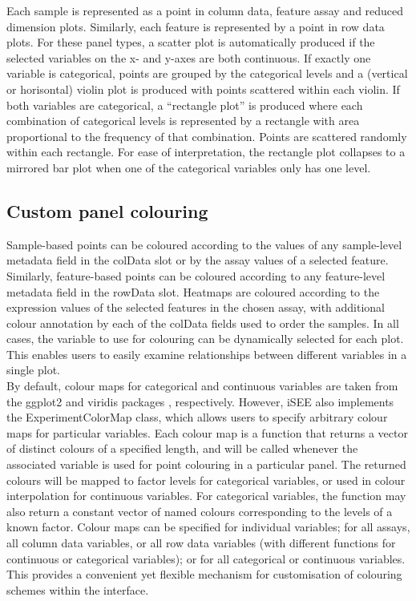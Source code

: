 \documentclass[10pt,a4paper,twocolumn]{article}
\begin{document}
Each sample is represented as a point in column data, feature assay and reduced dimension plots.
Similarly, each feature is represented by a point in row data plots.
For these panel types, a scatter plot is automatically produced if the selected variables on the x- and y-axes are both continuous.
If exactly one variable is categorical, points are grouped by the categorical levels and a (vertical or horisontal) violin plot is produced with points scattered within each violin.
If both variables are categorical, a ``rectangle plot'' is produced where each combination of categorical levels is represented by a rectangle with area proportional to the frequency of that combination.
Points are scattered randomly within each rectangle.
For ease of interpretation, the rectangle plot collapses to a mirrored bar plot when one of the categorical variables only has one level.

\subsection*{Custom panel colouring}
Sample-based points can be coloured according to the values of any sample-level metadata field in the colData slot or by the assay values of a selected feature.
Similarly, feature-based points can be coloured according to any feature-level metadata field in the rowData slot.
Heatmaps are coloured according to the expression values of the selected features in the chosen assay,
with additional colour annotation by each of the colData fields used to order the samples.
In all cases, the variable to use for colouring can be dynamically selected for each plot.
This enables users to easily examine relationships between different variables in a single plot. \\

By default, colour maps for categorical and continuous variables are taken from the ggplot2 \citep{wickham2009ggplot2} and viridis packages \citep{garnier2018viridis}, respectively.
However, iSEE also implements the ExperimentColorMap class, which allows users to specify arbitrary colour maps for particular variables.
Each colour map is a function that returns a vector of distinct colours of a specified length, and will be called whenever the associated variable is used for point colouring in a particular panel.
The returned colours will be mapped to factor levels for categorical variables, or used in colour interpolation for continuous variables.
For categorical variables, the function may also return a constant vector of named colours corresponding to the levels of a known factor.
Colour maps can be specified for individual variables; for all assays, all column data variables, or all row data variables (with different functions for continuous or categorical variables); or for all categorical or continuous variables.
This provides a convenient yet flexible mechanism for customisation of colouring schemes within the interface.
\end{document}

